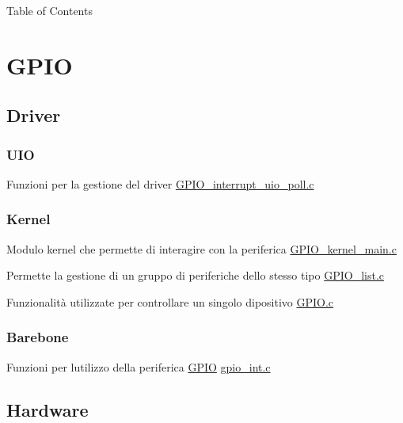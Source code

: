 \begin{DoxyParagraph}{Table of Contents}

\end{DoxyParagraph}
\hypertarget{index_GPIO}{}\section{G\+P\+IO}\label{index_GPIO}
\hypertarget{index_Driver}{}\subsection{Driver}\label{index_Driver}
\hypertarget{index_UIO}{}\subsubsection{U\+IO}\label{index_UIO}

\begin{DoxyItemize}
\item Funzioni per la gestione del driver \hyperlink{GPIO__interrupt__uio__poll_8c}{G\+P\+I\+O\+\_\+interrupt\+\_\+uio\+\_\+poll.\+c} 
\end{DoxyItemize}\hypertarget{index_Kernel}{}\subsubsection{Kernel}\label{index_Kernel}

\begin{DoxyItemize}
\item Modulo kernel che permette di interagire con la periferica \hyperlink{GPIO__kernel__main_8c}{G\+P\+I\+O\+\_\+kernel\+\_\+main.\+c}
\item Permette la gestione di un gruppo di periferiche dello stesso tipo \hyperlink{GPIO__list_8c}{G\+P\+I\+O\+\_\+list.\+c}
\item Funzionalità utilizzate per controllare un singolo dipositivo \hyperlink{GPIO_8c}{G\+P\+I\+O.\+c} 
\end{DoxyItemize}\hypertarget{index_Barebone}{}\subsubsection{Barebone}\label{index_Barebone}

\begin{DoxyItemize}
\item Funzioni per l\textquotesingle{}utilizzo della periferica \hyperlink{structGPIO}{G\+P\+IO}  \hyperlink{gpio__int_8c}{gpio\+\_\+int.\+c} 
\end{DoxyItemize}\hypertarget{index_Hardware}{}\subsection{Hardware}\label{index_Hardware}

